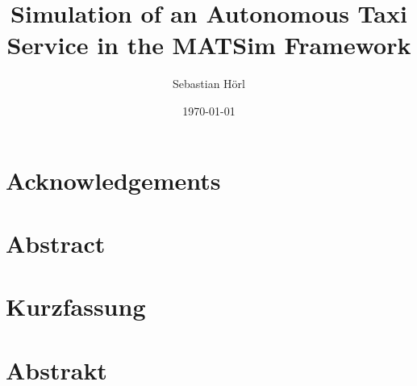 \documentclass[12pt,a4paper]{article}
\title{Simulation of an Autonomous Taxi Service in the MATSim Framework}
\author{
    Sebastian Hörl
}
\date{\today}
\begin{document}

\pagebreak


\tableofcontents
\pagebreak

\section*{Acknowledgements}
\pagebreak

\section*{Abstract}
\pagebreak

\section*{Kurzfassung}
\pagebreak

\section*{Abstrakt}
\pagebreak


 \FloatBarrier \pagebreak
 \FloatBarrier \pagebreak
 \FloatBarrier \pagebreak
 \FloatBarrier \pagebreak
 \FloatBarrier \pagebreak
 \FloatBarrier \pagebreak
 \FloatBarrier \pagebreak


\end{document}
